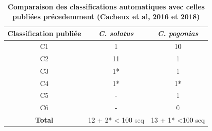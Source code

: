\documentclass[12pt,a4paper]{article}
\begin{document}
		\begin{table}
			\center
			\begin{tabular}{|c|c|c|}
	    	\hline
			\textbf{Classification publiée} &  \textbf{\textit{C. solatus}}  & \textbf{\textit{C. pogonias}}\\
			\hline
			C1 &  1  & 10\\
			\hline
			C2 & 11  & 1 \\
			\hline
			C3 & 1* & 1 \\
			\hline
			C4 & 1* & 1* \\
			\hline
			C5 & - 	 &  1 \\
			\hline
			C6 & -   &  0 \\
			\hline
			\textbf{Total} & 12 + 2* < 100 seq  &  13 + 1* <100 seq \\
			\hline
		\end{tabular}
		\caption{\textbf{Comparaison des classifications automatiques avec celles publiées précedemment (Cacheux et al, 2016 et 2018)}}
		\label{tab_count_fam}
	\end{table}
		
\end{document}
